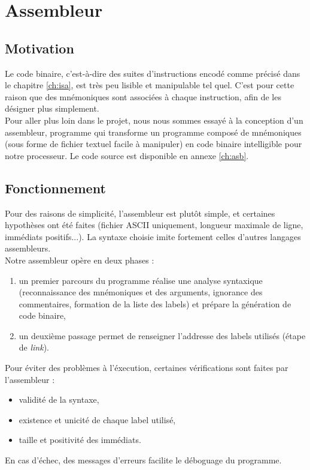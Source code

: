 \chapter{Assembleur}
\label{ch:assembleur}

\section{Motivation}

Le code binaire, c'est-à-dire des suites d'instructions encodé comme précisé
dans le chapitre \ref{ch:isa}, est très peu lisible et manipulable tel quel.
C'est pour cette raison que des mnémoniques sont associées à chaque instruction,
afin de les désigner plus simplement. \\

Pour aller plus loin dans le projet, nous nous sommes essayé à la conception
d'un assembleur, programme qui transforme un programme composé de mnémoniques
(sous forme de fichier textuel facile à manipuler) en code binaire
intelligible pour notre processeur. Le code source est disponible en annexe
\ref{ch:asb}.

\section{Fonctionnement}

Pour des raisons de simplicité, l'assembleur est plutôt simple, et certaines
hypothèses ont été faites (fichier ASCII uniquement, longueur maximale de
ligne, immédiats positifs...). La syntaxe choisie imite fortement celles
d'autres langages assembleurs. \\

Notre assembleur opère en deux phases :
\begin{enumerate}
\item un premier parcours du programme réalise une analyse syntaxique
    (reconnaissance des mnémoniques et des arguments, ignorance des
    commentaires, formation de la liste des labels) et prépare la génération de
    code binaire,
\item un deuxième passage permet de renseigner l'addresse des labels utilisés
    (étape de \textit{link}). \\
\end{enumerate}

Pour éviter des problèmes à l'éxecution, certaines vérifications sont faites
par l'assembleur :
\begin{itemize}
\item validité de la syntaxe,
\item existence et unicité de chaque label utilisé,
\item taille et positivité des immédiats.
\end{itemize}
En cas d'échec, des messages d'erreurs facilite le déboguage du programme.

